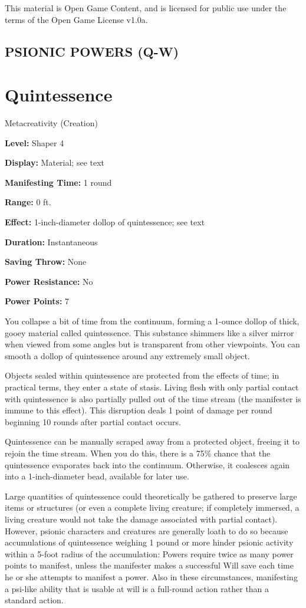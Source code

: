\documentclass{article}
\begin{document}
This material is Open Game Content, and is licensed for public use under the terms 
of the Open Game License v1.0a.

\subsection*{{\LARGE{}PSIONIC POWERS (Q-W)}}

\vspace{12pt}
\section*{Quintessence}

Metacreativity (Creation)

\textbf{Level:} Shaper 4

\textbf{Display:} Material; see text

\textbf{Manifesting Time:} 1 round

\textbf{Range:} 0 ft.

\textbf{Effect:} 1-inch-diameter dollop of quintessence; see text

\textbf{Duration:} Instantaneous

\textbf{Saving Throw:} None

\textbf{Power Resistance:} No

\textbf{Power Points:} 7

You collapse a bit of time from the continuum, forming a 1-ounce dollop of thick, 
gooey material called quintessence. This substance shimmers like a silver mirror 
when viewed from some angles but is transparent from other viewpoints. You can 
smooth a dollop of quintessence around any extremely small object.

Objects sealed within quintessence are protected from the effects of time; in practical 
terms, they enter a state of stasis. Living flesh with only partial contact with 
quintessence is also partially pulled out of the time stream (the manifester is 
immune to this effect). This disruption deals 1 point of damage per round beginning 
10 rounds after partial contact occurs.

Quintessence can be manually scraped away from a protected object, freeing it to 
rejoin the time stream. When you do this, there is a 75\% chance that the quintessence 
evaporates back into the continuum. Otherwise, it coalesces again into a 1-inch-diameter 
bead, available for later use.

Large quantities of quintessence could theoretically be gathered to preserve large 
items or structures (or even a complete living creature; if completely immersed, 
a living creature would not take the damage associated with partial contact). However, 
psionic characters and creatures are generally loath to do so because accumulations 
of quintessence weighing 1 pound or more hinder psionic activity within a 5-foot 
radius of the accumulation: Powers require twice as many power points to manifest, 
unless the manifester makes a successful Will save each time he or she attempts 
to manifest a power. Also in these circumstances, manifesting a psi-like ability 
that is usable at will is a full-round action rather than a standard action.
\end{document}
